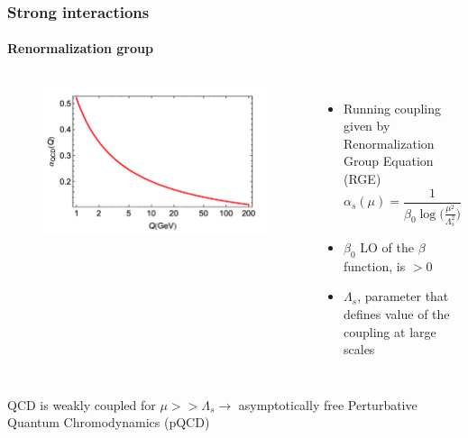 \documentclass[aspectratio=43]{beamer}
\begin{document}
\begin{frame}

	\frametitle{Strong interactions}
	\framesubtitle{Renormalization group}

	\begin{columns}	
	
	
	\begin{figure}
		\includegraphics[width = 5 cm]{plots/qcd_coupling.png}
	\end{figure}
	
	
	\begin{itemize}
		\item \footnotesize Running coupling given by Renormalization Group Equation (RGE)
		\begin{equation}
			\alpha_{s}(\mu) = \frac{1}{\beta_{0} \log\big( \frac{\mu^{2}}{\Lambda_{s}^{2}}\big)} \nonumber
		\end{equation}
		\item \footnotesize $\beta_{0}$ LO of the $\beta$ function, is $ > 0$
		\item \footnotesize $\Lambda_{s}$, parameter that defines value of the coupling at large scales
	\end{itemize}
	
\end{columns}
	
	\vspace{1cm}
	\center QCD is weakly coupled for $\mu >> \Lambda_{s} \longrightarrow$ asymptotically free
	\center \color{red} Perturbative Quantum Chromodynamics (pQCD)

\end{frame}
\end{document}
